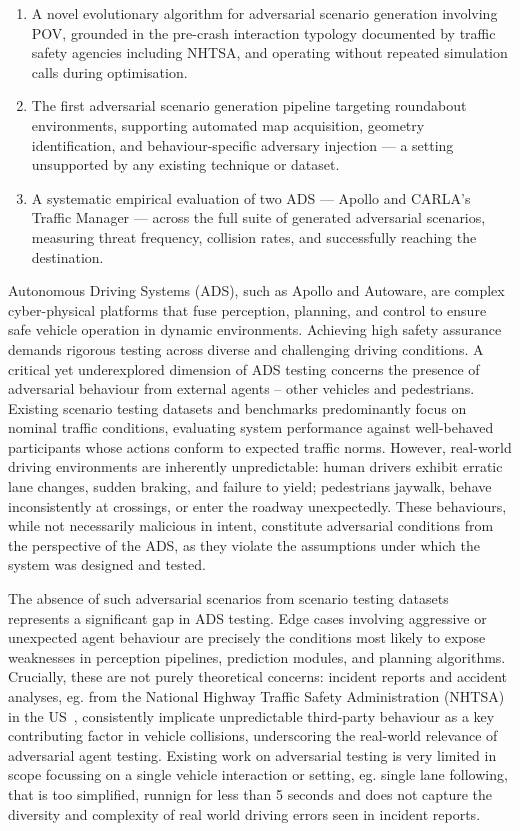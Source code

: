 \documentclass[sigconf,review,anonymous]{acmart}
\begin{document}
\begin{enumerate}
    \item A novel evolutionary algorithm for adversarial scenario generation involving POV, grounded in the pre-crash interaction typology documented by traffic safety agencies including NHTSA, and operating without repeated simulation calls during optimisation.
    \item The first adversarial scenario generation pipeline targeting roundabout environments, supporting automated map acquisition, geometry identification, and behaviour-specific adversary injection — a setting unsupported by any existing technique or dataset.
    \item A systematic empirical evaluation of two ADS — Apollo and CARLA's Traffic Manager — across the full suite of generated adversarial scenarios, measuring threat frequency, collision rates, and successfully reaching the destination.
\end{enumerate}
\iffalse
Autonomous Driving Systems (ADS), such as Apollo and Autoware, are complex cyber-physical platforms that fuse perception, planning, and control to ensure safe vehicle operation in dynamic environments. Achieving high safety assurance demands rigorous testing across diverse and challenging driving conditions.
A critical yet underexplored dimension of ADS testing concerns the presence of adversarial behaviour from external agents -- other vehicles and pedestrians. Existing scenario testing datasets and benchmarks predominantly focus on nominal traffic conditions, evaluating system performance against well-behaved participants whose actions conform to expected traffic norms. However, real-world driving environments are inherently unpredictable: human drivers exhibit erratic lane changes, sudden braking, and failure to yield; pedestrians jaywalk, behave inconsistently at crossings, or enter the roadway unexpectedly. These behaviours, while not necessarily malicious in intent, constitute adversarial conditions from the perspective of the ADS, as they violate the assumptions under which the system was designed and tested.

The absence of such adversarial scenarios from scenario testing datasets represents a significant gap in ADS testing. Edge cases involving aggressive or unexpected agent behaviour are precisely the conditions most likely to expose weaknesses in perception pipelines, prediction modules, and planning algorithms. Crucially, these are not purely theoretical concerns: incident reports and accident analyses, eg. from the National Highway Traffic Safety Administration (NHTSA) in the US~\cite{noauthor_pre-crash_nodate},  consistently implicate unpredictable third-party behaviour as a key contributing factor in vehicle collisions, underscoring the real-world relevance of adversarial agent testing. Existing work on adversarial testing is very limited in scope focussing on a single vehicle interaction or setting, eg. single lane following, that is too simplified, runnign for less than 5 seconds and does not capture the diversity and complexity of real world driving errors seen in incident reports. 
\end{document}

